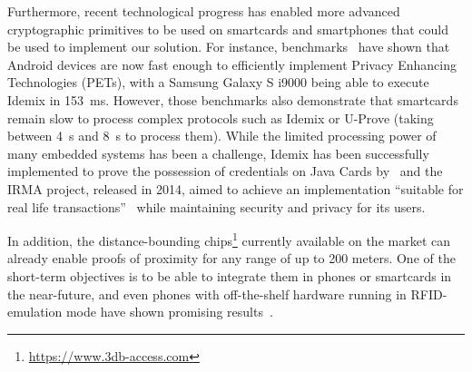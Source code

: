 Furthermore, recent technological progress has enabled more advanced cryptographic primitives to be used on smartcards and smartphones that could be used to implement our solution.
For instance, benchmarks~\cite{Benchmarking} have shown that Android devices are now fast enough to efficiently implement Privacy Enhancing Technologies (PETs), with a Samsung Galaxy S i9000 being able to execute Idemix in \SI{153}{\milli\second}. 
However, those benchmarks also demonstrate that smartcards remain slow to process complex protocols such as Idemix or U-Prove (taking between \SI{4}{\second} and \SI{8}{\second} to process them). %
While the limited processing power of many embedded systems has been a challenge, Idemix has been successfully implemented to prove the possession of credentials on Java Cards by~\citet{Bichsel} and the IRMA project, released in 2014, aimed to achieve an implementation ``suitable for real life transactions''~\cite{IRMA} while maintaining security and privacy for its users. 

In addition, the distance-bounding chips\footnote{\url{https://www.3db-access.com}} currently available on the market can already enable proofs of proximity for any range of up to 200 meters.
One of the short-term objectives is to be able to integrate them in phones or smartcards in the near-future, and even phones with off-the-shelf hardware running in RFID-emulation mode have shown promising results~\cite{DBonSmartphones}.






